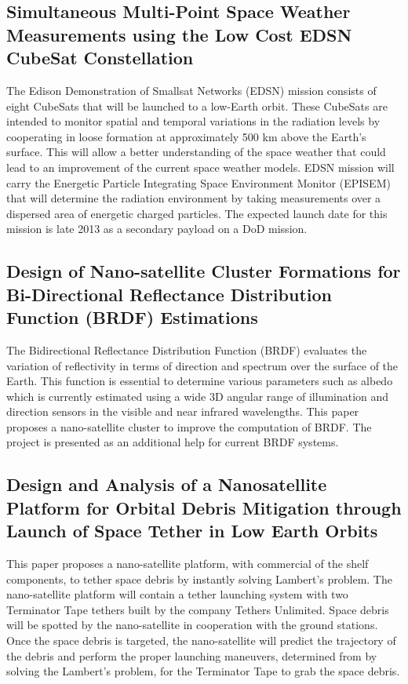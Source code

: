 \subsection{Simultaneous Multi-Point Space Weather Measurements using the Low Cost EDSN CubeSat Constellation}

The Edison Demonstration of Smallsat Networks (EDSN) mission consists of eight CubeSats that will be launched to a low-Earth orbit. These CubeSats are intended to monitor spatial and temporal variations in the radiation levels by cooperating in loose formation at approximately 500 km above the Earth's surface. This will allow a better understanding of the space weather that could lead to an improvement of the current space weather models. EDSN mission will carry the Energetic Particle Integrating Space Environment Monitor (EPISEM) that will determine the radiation environment by taking measurements over a dispersed area of energetic charged particles. The expected launch date for this mission is late 2013 as a secondary payload on a DoD mission.\cite{Gunderson_MultiptMeasureConstellation}\cite{Yost_MultipointMeasurement}

\subsection{Design of Nano-satellite Cluster Formations for Bi-Directional Reflectance Distribution Function (BRDF) Estimations}

The Bidirectional Reflectance Distribution Function (BRDF) evaluates the variation of reflectivity in terms of direction and spectrum over the surface of the Earth. This function is essential to determine various parameters such as albedo which is currently estimated using a wide 3D angular range of illumination and direction sensors in the visible and near infrared wavelengths. This paper proposes a nano-satellite cluster to improve the computation of BRDF. The project is presented as an additional help for current BRDF systems.\cite{Nag_BRDF}

\subsection{Design and Analysis of a Nanosatellite Platform for Orbital Debris Mitigation through Launch of Space Tether in Low Earth Orbits}

This paper proposes a nano-satellite platform, with commercial of the shelf components, to tether space debris by instantly solving Lambert's problem. The nano-satellite platform will contain a tether launching system with two Terminator Tape tethers built by the company Tethers Unlimited. Space debris will be spotted by the nano-satellite in cooperation with the ground stations. Once the space debris is targeted, the nano-satellite will predict the trajectory of the debris and perform the proper launching maneuvers, determined from by solving the Lambert's problem, for the Terminator Tape to grab the space debris.\cite{Asundi_SpaceDebris} 

